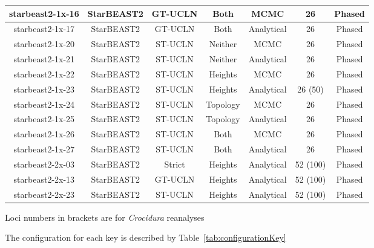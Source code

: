 \documentclass[12pt]{article}
\begin{document}
\begin{table}[htb!]
\begin{threeparttable}
\begin{adjustbox}{center}
\begin{tabular}{|c|c|c|c|c|c|c|}
\hline
starbeast2-1x-16 & StarBEAST2 & GT-UCLN & Both & MCMC & 26 & Phased\tabularnewline
\hline
starbeast2-1x-17 & StarBEAST2 & GT-UCLN & Both & Analytical & 26 & Phased\tabularnewline
\hline
starbeast2-1x-20 & StarBEAST2 & ST-UCLN & Neither & MCMC & 26 & Phased\tabularnewline
\hline
starbeast2-1x-21 & StarBEAST2 & ST-UCLN & Neither & Analytical & 26 & Phased\tabularnewline
\hline
starbeast2-1x-22 & StarBEAST2 & ST-UCLN & Heights & MCMC & 26 & Phased\tabularnewline
\hline
starbeast2-1x-23 & StarBEAST2 & ST-UCLN & Heights & Analytical & 26 (50) & Phased\tabularnewline
\hline
starbeast2-1x-24 & StarBEAST2 & ST-UCLN & Topology & MCMC & 26 & Phased\tabularnewline
\hline
starbeast2-1x-25 & StarBEAST2 & ST-UCLN & Topology & Analytical & 26 & Phased\tabularnewline
\hline
starbeast2-1x-26 & StarBEAST2 & ST-UCLN & Both & MCMC & 26 & Phased\tabularnewline
\hline
starbeast2-1x-27 & StarBEAST2 & ST-UCLN & Both & Analytical & 26 & Phased\tabularnewline
\hline
starbeast2-2x-03 & StarBEAST2 & Strict & Heights & Analytical & 52 (100) & Phased\tabularnewline
\hline
starbeast2-2x-13 & StarBEAST2 & GT-UCLN & Heights & Analytical & 52 (100) & Phased\tabularnewline
\hline
starbeast2-2x-23 & StarBEAST2 & ST-UCLN & Heights & Analytical & 52 (100) & Phased\tabularnewline
\hline
\end{tabular}
\end{adjustbox}
\begin{tablenotes}
\item Loci numbers in brackets are for \textit{Crocidura} reanalyses
\item The configuration for each key is described by Table~\ref{tab:configurationKey}
\end{tablenotes}
\end{threeparttable}
\end{table}
\end{document}
